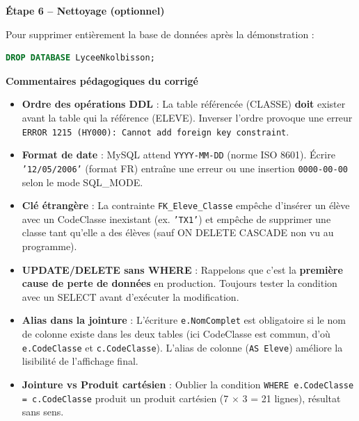 \documentclass[11pt]{article}
\newcommand{\cle}[1]{{\popxbold\color{popdark}#1}}
\begin{document}
\begin{exoresolu}
\textbf{Étape 6 -- Nettoyage (optionnel)}\par
Pour supprimer entièrement la base de données après la démonstration :
\begin{lstlisting}[language=SQL]
DROP DATABASE LyceeNkolbisson;
\end{lstlisting}
\tcblower
\textbf{Commentaires pédagogiques du corrigé}
\begin{itemize}
    \item \textbf{Ordre des opérations DDL} : La table référencée (\cle{CLASSE}) \textbf{doit} exister avant la table qui la référence (\cle{ELEVE}). Inverser l'ordre provoque une erreur \texttt{ERROR 1215 (HY000): Cannot add foreign key constraint}.
    \item \textbf{Format de date} : MySQL attend \texttt{YYYY-MM-DD} (norme ISO 8601). Écrire \texttt{'12/05/2006'} (format FR) entraîne une erreur ou une insertion \texttt{0000-00-00} selon le mode \cle{SQL\_MODE}.
    \item \textbf{Clé étrangère} : La contrainte \texttt{FK\_Eleve\_Classe} empêche d'insérer un élève avec un \cle{CodeClasse} inexistant (ex. \texttt{'TX1'}) et empêche de supprimer une classe tant qu'elle a des élèves (sauf \cle{ON DELETE CASCADE} non vu au programme).
    \item \textbf{\cle{UPDATE}/\cle{DELETE} sans \cle{WHERE}} : Rappelons que c'est la \textbf{première cause de perte de données} en production. Toujours tester la condition avec un \cle{SELECT} avant d'exécuter la modification.
    \item \textbf{Alias dans la jointure} : L'écriture \texttt{e.NomComplet} est obligatoire si le nom de colonne existe dans les deux tables (ici \cle{CodeClasse} est commun, d'où \texttt{e.CodeClasse} et \texttt{c.CodeClasse}). L'alias de colonne (\texttt{AS Eleve}) améliore la lisibilité de l'affichage final.
    \item \textbf{Jointure vs Produit cartésien} : Oublier la condition \texttt{WHERE e.CodeClasse = c.CodeClasse} produit un produit cartésien (7 $\times$ 3 = 21 lignes), résultat sans sens.
\end{itemize}
\end{exoresolu}
\end{document}

